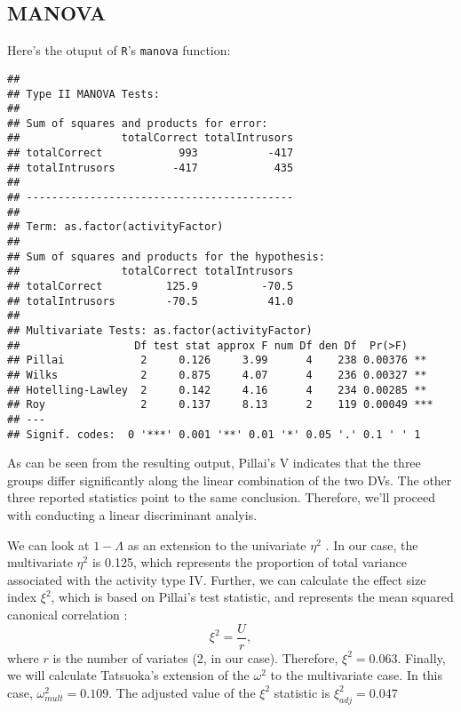 \documentclass[11pt,]{article}
\begin{document}
\hypertarget{manova}{%
\subsection{MANOVA}\label{manova}}

Here's the otuput of \texttt{R}'s \texttt{manova} function:

\begin{verbatim}
## 
## Type II MANOVA Tests:
## 
## Sum of squares and products for error:
##                totalCorrect totalIntrusors
## totalCorrect            993           -417
## totalIntrusors         -417            435
## 
## ------------------------------------------
##  
## Term: as.factor(activityFactor) 
## 
## Sum of squares and products for the hypothesis:
##                totalCorrect totalIntrusors
## totalCorrect          125.9          -70.5
## totalIntrusors        -70.5           41.0
## 
## Multivariate Tests: as.factor(activityFactor)
##                  Df test stat approx F num Df den Df  Pr(>F)    
## Pillai            2     0.126     3.99      4    238 0.00376 ** 
## Wilks             2     0.875     4.07      4    236 0.00327 ** 
## Hotelling-Lawley  2     0.142     4.16      4    234 0.00285 ** 
## Roy               2     0.137     8.13      2    119 0.00049 ***
## ---
## Signif. codes:  0 '***' 0.001 '**' 0.01 '*' 0.05 '.' 0.1 ' ' 1
\end{verbatim}

As can be seen from the resulting output, Pillai's V indicates that the
three groups differ significantly along the linear combination of the
two DVs. The other three reported statistics point to the same
conclusion. Therefore, we'll proceed with conducting a linear
discriminant analyis.

We can look at \(1 - \Lambda\) as an extension to the univariate
\(\eta^2\) \citep{hubertyAppliedMANOVADiscriminant2006}. In our case,
the multivariate \(\eta^2\) is 0.125, which represents the proportion of
total variance associated with the activity type IV. Further, we can
calculate the effect size index \(\xi^2\), which is based on Pillai's
test statistic, and represents the mean squared canonical correlation
\citep{hubertyAppliedMANOVADiscriminant2006}: \[\xi^2 = \frac{U}{r},\]
where \(r\) is the number of variates (2, in our case). Therefore,
\(\xi^2 = 0.063\). Finally, we will calculate Tatsuoka's
\citep[1970; according to][]{hubertyAppliedMANOVADiscriminant2006}
extension of the \(\omega^2\) to the multivariate case. In this case,
\(\omega^2_{mult} = 0.109\). The adjusted value of the \(\xi^2\)
statistic is \(\xi^2_{adj} = 0.047\)
\end{document}
